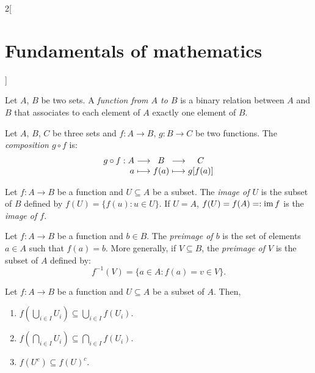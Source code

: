 \documentclass[../../../main.tex]{subfiles}
\begin{document}
\begin{multicols}{2}[\section{Fundamentals of mathematics}]
\begin{prop}
\begin{enumerate}
        \end{enumerate}
    \end{prop}
    \begin{definition}
        Let $A$, $B$ be two sets. A \textit{function from $A$ to $B$} is a binary relation between $A$ and $B$ that associates to each element of $A$ exactly one element of $B$.
    \end{definition}
    \begin{definition}
        Let $A$, $B$, $C$ be three sets and $f:A\rightarrow B$, $g:B\rightarrow C$ be two functions. The \textit{composition $g\circ f$} is:
        $$\begin{array}{r@{\hspace{0.5\tabcolsep}}c@{\hspace{0.5\tabcolsep}}c@{\hspace{0.5\tabcolsep}}c@{\hspace{0.5\tabcolsep}}c}
            g\circ f:A&\longrightarrow & B & \longrightarrow &C\\
            a&\longmapsto & f(a) & \longmapsto & g[f(a)]
        \end{array}$$
    \end{definition}
    \begin{definition}
        Let $f:A\rightarrow B$ be a function and $U\subseteq A$ be a subset. The \textit{image of $U$} is the subset of $B$ defined by $f(U)=\{f(u): u\in U\}$. If $U=A$, $f(U)=f(A)=:\operatorname{im} f$ is the \textit{image of $f$}.
    \end{definition}
    \begin{definition}
        Let $f:A\rightarrow B$ be a function and $b\in B$. The \textit{preimage of $b$} is the set of elements $a\in A$ such that $f(a)=b$. More generally, if $V\subseteq B$, the \textit{preimage of $V$} is the subset of $A$ defined by: $$f^{-1}(V)=\{a\in A: f(a)=v\in V\}.$$
    \end{definition}
    \begin{prop}
        Let $f:A\rightarrow B$ be a function and $U\subseteq A$ be a subset of $A$. Then,
        \begin{enumerate}
            \item $f\left(\bigcup_{i\in I}U_i\right)\subseteq\bigcup_{i\in I}f(U_i)$.
            \item $f\left(\bigcap_{i\in I}U_i\right)\subseteq\bigcap_{i\in I}f(U_i)$.
            \item $f(U^c)\subseteq f(U)^c$.
        \end{enumerate}
    \end{prop}

\end{multicols}
\end{document}
